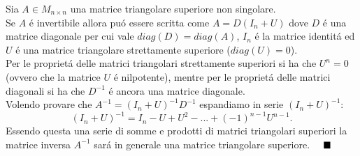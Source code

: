 Sia $A \in M_{n \times n}$ una matrice triangolare superiore non singolare.\\
Se $A$ \'e invertibile allora pu\'o essere scritta come $A=D(\mathit{I_n}+U)$ dove $D$ \'e una matrice diagonale per cui vale $diag(D)=diag(A)$, $\mathit{I_n}$ \'e la matrice identit\'a ed $U$ \'e una matrice triangolare strettamente superiore ($diag(U)=0$).\\
Per le propriet\'a delle matrici triangolari strettamente superiori si ha che $U^n = 0$ (ovvero che la matrice $U$ \'e nilpotente), mentre per le propriet\'a delle matrici diagonali si ha che $D^{-1}$ \'e ancora una matrice diagonale.
\\
Volendo provare che $A^{-1}=(\mathit{I_n}+U)^{-1}D^{-1}$ espandiamo in serie $ (\mathit{I_n}+U)^{-1}$:
\[
(\mathit{I_n}+U)^{-1}=\mathit{I_n}-U+U^2-...+(-1)^{n-1}U^{n-1}.
\]
Essendo questa una serie di somme e prodotti di matrici triangolari superiori la matrice inversa $A^{-1}$ sar\'a in generale una matrice triangolare superiore.
$\hspace{1em}\blacksquare$
